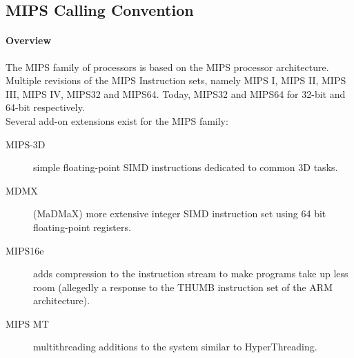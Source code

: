 %
%
%
%

\subsection{MIPS Calling Convention}

\paragraph{Overview}

The MIPS family of processors is based on the MIPS processor architecture.
Multiple revisions of the MIPS Instruction sets, namely MIPS I, MIPS II, MIPS III, MIPS IV, MIPS32 and MIPS64.
Today, MIPS32 and MIPS64 for 32-bit and 64-bit respectively.\\
Several add-on extensions exist for the MIPS family: 

\begin{description}
\item [MIPS-3D] simple floating-point SIMD instructions dedicated to common 3D tasks.
\item [MDMX] (MaDMaX) more extensive integer SIMD instruction set using 64 bit floating-point registers.
\item [MIPS16e] adds compression to the instruction stream to make programs take up less room (allegedly a response to the THUMB instruction set of the ARM architecture).
\item [MIPS MT] multithreading additions to the system similar to HyperThreading.
\end{description}

